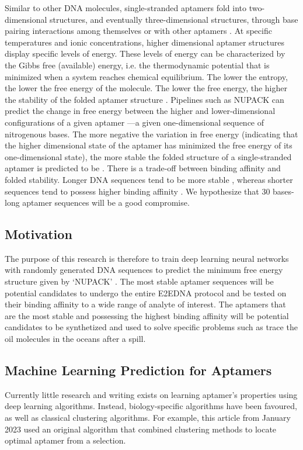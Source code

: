 \documentclass[11pt]{article}
\begin{document}
Similar to other DNA molecules, single-stranded aptamers fold into two-dimensional structures, and eventually three-dimensional structures, through base pairing interactions among themselves or with other aptamers \cite{alberts2002molecular}. At specific temperatures and ionic concentrations, higher dimensional aptamer structures display specific levels of energy. These levels of energy can be characterized by the Gibbs free (available) energy, i.e. the thermodynamic potential that is minimized when a system reaches chemical equilibrium. The lower the entropy, the lower the free energy of the molecule. The lower the free energy, the higher the stability of the folded aptamer structure \cite{gibbs1873a}. Pipelines such as NUPACK can predict the change in free energy between the higher and lower-dimensional configurations of a given aptamer —a given one-dimensional sequence of nitrogenous bases. The more negative the variation in free energy (indicating that the higher dimensional state of the aptamer has minimized the free energy of its one-dimensional state), the more stable the folded structure of a single-stranded aptamer is predicted to be \cite{zadeh2011nupack}.
There is a trade-off between binding affinity and folded stability. Longer DNA sequences tend to be more stable \cite{tulpan2010free}, whereas shorter sequences tend to possess higher binding affinity \cite{dunn2017analysis}. We hypothesize that 30 bases-long aptamer sequences will be a good compromise.   

\subsection{Motivation}
The purpose of this research is therefore to train deep learning neural 
networks with randomly generated DNA sequences to predict the minimum 
free energy structure given by ‘NUPACK’ \cite{zadeh2011nupack}.
The most stable aptamer sequences will be potential candidates to 
undergo the entire E2EDNA protocol \cite{kilgour2021e2edna} and be tested on their binding affinity to a wide range of analyte of interest. The aptamers that are the most stable and possessing the highest binding affinity will be potential candidates to be synthetized and used to solve specific problems such as trace the oil molecules in the oceans after a spill.  

\subsection{Machine Learning Prediction for Aptamers}
Currently little research and writing exists on learning 
aptamer's properties using deep learning algorithms. Instead, biology-specific algorithms have been favoured, as well as classical clustering algorithms. For example, this article \cite{acssynbio.2c00462} from January 2023 used an original algorithm that combined clustering methods to locate optimal aptamer from a selection. 
\end{document}
